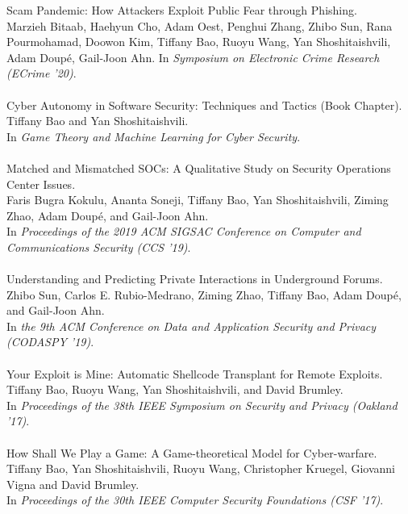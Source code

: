 \documentclass[11pt]{article}
\begin{document}
Scam Pandemic: How Attackers Exploit Public Fear through Phishing. \\
Marzieh Bitaab, Haehyun Cho, Adam Oest, Penghui Zhang, Zhibo Sun, Rana Pourmohamad, Doowon Kim, Tiffany Bao, Ruoyu Wang, Yan Shoshitaishvili, Adam Doupé, Gail-Joon Ahn.
In \emph{Symposium on Electronic Crime Research (ECrime '20)}.
\\\\
%
Cyber Autonomy in Software Security: Techniques and Tactics (Book Chapter). \\
Tiffany Bao and Yan Shoshitaishvili. \\
In \emph{Game Theory and Machine Learning for Cyber Security}.
\\\\
Matched and Mismatched SOCs: A Qualitative Study on Security Operations Center Issues. \\
Faris Bugra Kokulu, Ananta Soneji, Tiffany Bao, Yan Shoshitaishvili, Ziming Zhao, Adam Doupé, and Gail-Joon Ahn. \\
In \emph{Proceedings of the 2019 ACM SIGSAC Conference on Computer and Communications Security (CCS '19)}.
\\\\
%
Understanding and Predicting Private Interactions in Underground Forums. \\
Zhibo Sun, Carlos E. Rubio-Medrano, Ziming Zhao, Tiffany Bao, Adam Doupé, and Gail-Joon Ahn.\\
In \emph{the 9th ACM Conference on Data and Application Security and Privacy (CODASPY '19)}.
\\\\
%
Your Exploit is Mine: Automatic Shellcode Transplant for
Remote Exploits.\\
Tiffany Bao, Ruoyu Wang, Yan Shoshitaishvili, and David
Brumley.\\
In \emph{Proceedings of the 38th IEEE Symposium on
Security and Privacy (Oakland '17)}.
\\\\
%
How Shall We Play a Game: A Game-theoretical Model for
Cyber-warfare.\\
Tiffany Bao, Yan Shoshitaishvili, Ruoyu Wang, Christopher Kruegel,
Giovanni Vigna and David Brumley. \\
In \emph{Proceedings of the 30th IEEE Computer Security Foundations
(CSF '17)}. \\
\end{document}
